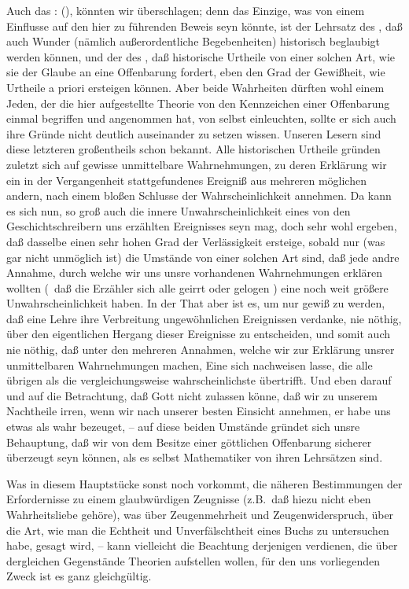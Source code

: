 Auch das :  (), könnten wir überschlagen; denn das Einzige, was von einem Einflusse auf den hier zu führenden Beweis seyn könnte, ist der Lehrsatz des , daß auch Wunder (nämlich außerordentliche Begebenheiten) historisch beglaubigt werden können, und der des , daß historische Urtheile von einer solchen Art, wie sie der Glaube an eine Offenbarung fordert, eben den Grad der Gewißheit, wie Urtheile a priori ersteigen können. Aber beide Wahrheiten dürften wohl einem Jeden, der die hier aufgestellte Theorie von den Kennzeichen einer Offenbarung einmal begriffen und angenommen hat, von selbst einleuchten, sollte er sich auch ihre Gründe nicht deutlich auseinander zu setzen wissen. Unseren Lesern sind diese letzteren großentheils schon bekannt. Alle historischen Urtheile gründen zuletzt sich auf gewisse unmittelbare Wahrnehmungen, zu deren Erklärung wir ein in der Vergangenheit stattgefundenes Ereigniß aus mehreren möglichen andern, nach einem bloßen Schlusse der Wahrscheinlichkeit annehmen. Da kann es sich nun, so groß auch die innere Unwahrscheinlichkeit eines von den Geschichtschreibern uns erzählten Ereignisses seyn mag, doch sehr wohl ergeben, daß dasselbe einen sehr hohen Grad der Verlässigkeit ersteige, sobald nur (was gar nicht unmöglich ist) die Umstände von einer solchen Art sind, daß jede andre Annahme, durch welche wir uns unsre vorhandenen Wahrnehmungen erklären wollten (\zB\ daß die Erzähler sich alle geirrt oder gelogen \usw ) eine noch weit größere Unwahrscheinlichkeit haben. In der That aber ist es, um nur gewiß zu werden, daß eine Lehre ihre Verbreitung ungewöhnlichen Ereignissen verdanke, nie nöthig, über den eigentlichen Hergang dieser Ereignisse zu entscheiden, und somit auch nie nöthig, daß unter den mehreren Annahmen, welche wir zur Erklärung unsrer unmittelbaren Wahrnehmungen machen, Eine sich nachweisen lasse, die alle übrigen als die vergleichungsweise wahrscheinlichste übertrifft. Und eben darauf und auf die Betrachtung, daß Gott nicht zulassen könne, daß wir zu unserem Nachtheile  irren, wenn wir nach unserer besten Einsicht annehmen, er habe uns etwas als wahr bezeuget, -- auf diese beiden Umstände gründet sich unsre Behauptung, daß wir von dem Besitze einer göttlichen Offenbarung sicherer überzeugt seyn können, als es selbst Mathematiker von ihren Lehrsätzen sind. \par
Was in diesem Hauptstücke sonst noch vorkommt, die näheren Bestimmungen der Erfordernisse zu einem glaubwürdigen Zeugnisse (z.B.\ daß hiezu nicht eben Wahrheitsliebe gehöre), was über Zeugenmehrheit und Zeugenwiderspruch, über die Art, wie man die Echtheit und Unverfälschtheit eines Buchs zu untersuchen habe, gesagt wird, -- kann vielleicht die Beachtung derjenigen verdienen, die über dergleichen Gegenstände Theorien aufstellen wollen, für den uns vorliegenden Zweck ist es ganz gleichgültig. \par
